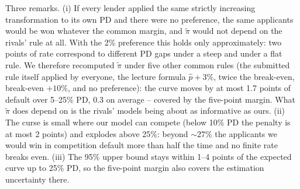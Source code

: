 \documentclass[11pt,a4paper]{article}
\begin{document}
\begin{table}[h]\centering\small
{}
\caption{The winner's curse per PD level, all income segments pooled, measured on the past loans when every lender prices
on its own model.}
\label{tab:curse}
\end{table}

Three remarks. (i) If every lender applied the same strictly increasing transformation to its own PD and there were no
preference, the same applicants would be won whatever the common margin, and $\tilde\pi$ would not depend on the rivals'
rule at all. With the 2\% preference this holds only approximately: two points of rate correspond to different PD gaps
under a steep and under a flat rule. We therefore recomputed $\tilde\pi$ under five other common rules (the submitted rule
itself applied by everyone, the lecture formula $\hat p + 3\%$, twice the break-even, break-even $+10\%$, and no
preference): the curve moves by at most 1.7 points of default over 5--25\% PD, 0.3 on average -- covered by the
five-point margin. What $\tilde\pi$ does depend on is the rivals' models being about as informative as ours. (ii) The
curse is small where our model can compete (below 10\% PD the penalty is at most 2 points) and explodes above 25\%:
beyond $\sim$27\% the applicants we would win in competition default more than half the time and no finite rate breaks
even. (iii) The 95\% upper bound stays within 1--4 points of the expected curve up to 25\% PD, so the five-point margin
also covers the estimation uncertainty there.
\end{document}

